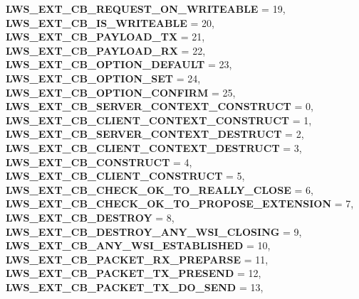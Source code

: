 \begin{DoxyCompactItemize}
{\bfseries L\+W\+S\+\_\+\+E\+X\+T\+\_\+\+C\+B\+\_\+\+R\+E\+Q\+U\+E\+S\+T\+\_\+\+O\+N\+\_\+\+W\+R\+I\+T\+E\+A\+B\+LE} = 19, 
{\bfseries L\+W\+S\+\_\+\+E\+X\+T\+\_\+\+C\+B\+\_\+\+I\+S\+\_\+\+W\+R\+I\+T\+E\+A\+B\+LE} = 20, 
{\bfseries L\+W\+S\+\_\+\+E\+X\+T\+\_\+\+C\+B\+\_\+\+P\+A\+Y\+L\+O\+A\+D\+\_\+\+TX} = 21, 
\newline
{\bfseries L\+W\+S\+\_\+\+E\+X\+T\+\_\+\+C\+B\+\_\+\+P\+A\+Y\+L\+O\+A\+D\+\_\+\+RX} = 22, 
{\bfseries L\+W\+S\+\_\+\+E\+X\+T\+\_\+\+C\+B\+\_\+\+O\+P\+T\+I\+O\+N\+\_\+\+D\+E\+F\+A\+U\+LT} = 23, 
{\bfseries L\+W\+S\+\_\+\+E\+X\+T\+\_\+\+C\+B\+\_\+\+O\+P\+T\+I\+O\+N\+\_\+\+S\+ET} = 24, 
{\bfseries L\+W\+S\+\_\+\+E\+X\+T\+\_\+\+C\+B\+\_\+\+O\+P\+T\+I\+O\+N\+\_\+\+C\+O\+N\+F\+I\+RM} = 25, 
\newline
{\bfseries L\+W\+S\+\_\+\+E\+X\+T\+\_\+\+C\+B\+\_\+\+S\+E\+R\+V\+E\+R\+\_\+\+C\+O\+N\+T\+E\+X\+T\+\_\+\+C\+O\+N\+S\+T\+R\+U\+CT} = 0, 
{\bfseries L\+W\+S\+\_\+\+E\+X\+T\+\_\+\+C\+B\+\_\+\+C\+L\+I\+E\+N\+T\+\_\+\+C\+O\+N\+T\+E\+X\+T\+\_\+\+C\+O\+N\+S\+T\+R\+U\+CT} = 1, 
{\bfseries L\+W\+S\+\_\+\+E\+X\+T\+\_\+\+C\+B\+\_\+\+S\+E\+R\+V\+E\+R\+\_\+\+C\+O\+N\+T\+E\+X\+T\+\_\+\+D\+E\+S\+T\+R\+U\+CT} = 2, 
{\bfseries L\+W\+S\+\_\+\+E\+X\+T\+\_\+\+C\+B\+\_\+\+C\+L\+I\+E\+N\+T\+\_\+\+C\+O\+N\+T\+E\+X\+T\+\_\+\+D\+E\+S\+T\+R\+U\+CT} = 3, 
\newline
{\bfseries L\+W\+S\+\_\+\+E\+X\+T\+\_\+\+C\+B\+\_\+\+C\+O\+N\+S\+T\+R\+U\+CT} = 4, 
{\bfseries L\+W\+S\+\_\+\+E\+X\+T\+\_\+\+C\+B\+\_\+\+C\+L\+I\+E\+N\+T\+\_\+\+C\+O\+N\+S\+T\+R\+U\+CT} = 5, 
{\bfseries L\+W\+S\+\_\+\+E\+X\+T\+\_\+\+C\+B\+\_\+\+C\+H\+E\+C\+K\+\_\+\+O\+K\+\_\+\+T\+O\+\_\+\+R\+E\+A\+L\+L\+Y\+\_\+\+C\+L\+O\+SE} = 6, 
{\bfseries L\+W\+S\+\_\+\+E\+X\+T\+\_\+\+C\+B\+\_\+\+C\+H\+E\+C\+K\+\_\+\+O\+K\+\_\+\+T\+O\+\_\+\+P\+R\+O\+P\+O\+S\+E\+\_\+\+E\+X\+T\+E\+N\+S\+I\+ON} = 7, 
\newline
{\bfseries L\+W\+S\+\_\+\+E\+X\+T\+\_\+\+C\+B\+\_\+\+D\+E\+S\+T\+R\+OY} = 8, 
{\bfseries L\+W\+S\+\_\+\+E\+X\+T\+\_\+\+C\+B\+\_\+\+D\+E\+S\+T\+R\+O\+Y\+\_\+\+A\+N\+Y\+\_\+\+W\+S\+I\+\_\+\+C\+L\+O\+S\+I\+NG} = 9, 
{\bfseries L\+W\+S\+\_\+\+E\+X\+T\+\_\+\+C\+B\+\_\+\+A\+N\+Y\+\_\+\+W\+S\+I\+\_\+\+E\+S\+T\+A\+B\+L\+I\+S\+H\+ED} = 10, 
{\bfseries L\+W\+S\+\_\+\+E\+X\+T\+\_\+\+C\+B\+\_\+\+P\+A\+C\+K\+E\+T\+\_\+\+R\+X\+\_\+\+P\+R\+E\+P\+A\+R\+SE} = 11, 
\newline
{\bfseries L\+W\+S\+\_\+\+E\+X\+T\+\_\+\+C\+B\+\_\+\+P\+A\+C\+K\+E\+T\+\_\+\+T\+X\+\_\+\+P\+R\+E\+S\+E\+ND} = 12, 
{\bfseries L\+W\+S\+\_\+\+E\+X\+T\+\_\+\+C\+B\+\_\+\+P\+A\+C\+K\+E\+T\+\_\+\+T\+X\+\_\+\+D\+O\+\_\+\+S\+E\+ND} = 13, 

\end{DoxyCompactItemize}
